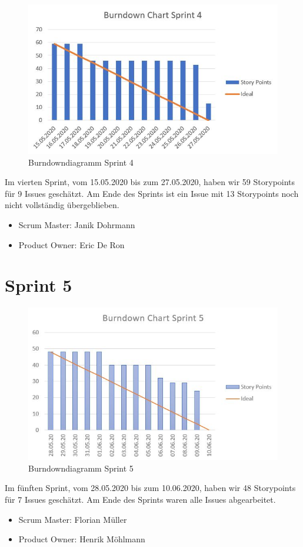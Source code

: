 \begin{figure}[H]
	\centering
	\includegraphics[width=\textwidth]{burndown/sprint4.jpg}
	\caption{Burndowndiagramm Sprint 4}
	\label{figure:burndown_sprint4}
\end{figure}

Im vierten Sprint, vom 15.05.2020 bis zum 27.05.2020, haben wir 59 Storypoints für 9 Issues geschätzt. Am Ende des Sprints ist ein Issue mit 13 Storypoints noch nicht vollständig übergeblieben.
\begin{itemize}
\item Scrum Master: Janik Dohrmann
\item Product Owner: Eric De Ron
\end{itemize}

\newpage
\section{Sprint 5}

\begin{figure}[H]
	\centering
	\includegraphics[width=\textwidth]{burndown/sprint5.jpg}
	\caption{Burndowndiagramm Sprint 5}
	\label{figure:burndown_sprint5}
\end{figure}

Im fünften Sprint, vom 28.05.2020 bis zum 10.06.2020, haben wir 48 Storypoints für 7 Issues geschätzt. Am Ende des Sprints waren alle Issues abgearbeitet.
\begin{itemize}
\item Scrum Master: Florian Müller
\item Product Owner: Henrik Möhlmann
\end{itemize}
